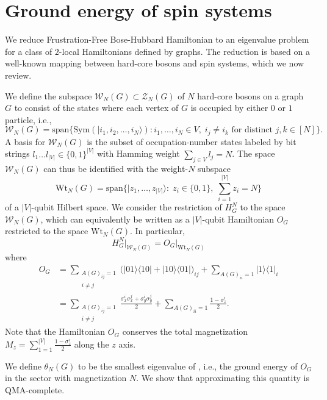 \documentclass[../thesis-main/thesis-main]{subfiles}
\begin{document}
\chapter{Ground energy of spin systems}
\label{chap:spin_ground}

We reduce Frustration-Free Bose-Hubbard Hamiltonian to an eigenvalue problem for a class of $2$-local Hamiltonians defined by graphs. The reduction is based on a well-known mapping between hard-core bosons and spin systems, which we now review.

We define the subspace $\mathcal{W}_N(G)\subset \mathcal{Z}_N (G)$ of $N$ hard-core bosons on a graph $G$ to consist of the states where each vertex of $G$ is occupied by either $0$ or $1$ particle, i.e., 
\[
  \mathcal{W}_N(G)=\text{span}\{\text{Sym}(|i_1,i_2,\ldots,i_N\rangle) \colon
  i_1,\ldots,i_N\in V,\; i_j\neq i_k \text{ for distinct } j,k\in[N] \}.
\]
A basis for $\mathcal{W}_N(G)$ is the subset of occupation-number states  labeled by bit strings $l_1\ldots l_{|V|}\in \{0,1\}^{|V|}$ with Hamming weight $\sum_{j\in V}l_j=N$.  The space $\mathcal{W}_N(G)$ can thus be identified with the weight-$N$ subspace
\[
\text{Wt}_N(G)=\text{span}\{|z_1,\ldots, z_{|V|}\rangle:\; z_i\in\{0,1\},\; \sum_{i=1}^{|V|} z_i =N\}
\]
of a $|V|$-qubit Hilbert space. We consider the restriction of $H_G^N$ to the space $\mathcal{W}_N(G)$, which can equivalently be written as a $|V|$-qubit Hamiltonian $O_G$ restricted to the space $\text{Wt}_N(G)$.  In particular,
\begin{equation}
H_G^N\big|_{\mathcal{W}_N(G)}=O_G\big|_{\text{Wt}_N(G)}
\label{eq:restriction_equality}
\end{equation}
where 
\begin{align*}
O_G & = \sum_{\substack{A(G)_{ij}=1 \\ i\neq j}}\big(|01\rangle\langle 10|+|10\rangle\langle 01|\big)_{ij} +\sum_{A(G)_{ii}=1} |1\rangle\langle1|_i\\
&=\sum_{\substack{A(G)_{ij}=1 \\ i\neq j}}\frac{\sigma_x^i \sigma_x^j+\sigma_y^i \sigma_y^j}{2}+\sum_{A(G)_{ii}=1}\frac{1-\sigma_z^{i}}{2}.
\end{align*}
Note that the Hamiltonian $O_G$ conserves the total magnetization $M_z=\sum_{1=1}^{|V|}\frac{1-\sigma_z^{i}}{2}$ along the $z$ axis. 

We define $\theta_N(G)$ to be the smallest eigenvalue of , i.e., the ground energy of $O_G$ in the sector with magnetization $N$. We show that approximating this quantity is QMA-complete.
\end{document}
